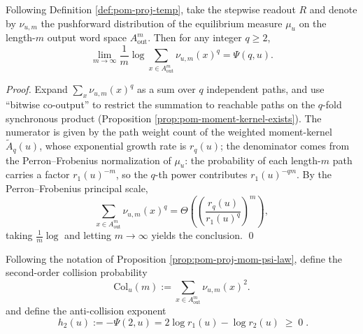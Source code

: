 \begin{proposition}\label{prop:pom-proj-mom-psi-law}
Following Definition \ref{def:pom-proj-temp}, take the stepwise readout \(R\) and denote by \(\nu_{u,m}\) the pushforward distribution of the equilibrium measure \(\mu_u\) on the length-\(m\) output word space \(A_{\mathrm{out}}^m\).
Then for any integer \(q\ge 2\),
\[
\lim_{m\to\infty}\frac{1}{m}\log\sum_{x\in A_{\mathrm{out}}^m}\nu_{u,m}(x)^q
=\Psi(q,u).
\]
\end{proposition}

\begin{proof}
Expand \(\sum_x\nu_{u,m}(x)^q\) as a sum over \(q\) independent paths, and use ``bitwise co-output'' to restrict the summation to reachable paths on the \(q\)-fold synchronous product (Proposition \ref{prop:pom-moment-kernel-exists}).
The numerator is given by the path weight count of the weighted moment-kernel \(\widetilde A_q(u)\), whose exponential growth rate is \(r_q(u)\); the denominator comes from the Perron--Frobenius normalization of \(\mu_u\): the probability of each length-\(m\) path carries a factor \(r_1(u)^{-m}\), so the \(q\)-th power contributes \(r_1(u)^{-qm}\).
By the Perron--Frobenius principal scale,
\[
\sum_{x\in A_{\mathrm{out}}^m}\nu_{u,m}(x)^q=\Theta\!\left(\left(\frac{r_q(u)}{r_1(u)^q}\right)^{\!m}\right),
\]
taking \(\frac1m\log\) and letting \(m\to\infty\) yields the conclusion. \qed
\end{proof}

\begin{definition}\label{def:pom-col-u-h2}
Following the notation of Proposition \ref{prop:pom-proj-mom-psi-law}, define the second-order collision probability
\[
\mathrm{Col}_u(m)
:=
\sum_{x\in A_{\mathrm{out}}^m}\nu_{u,m}(x)^2.
\]
and define the anti-collision exponent
\[
\boxed{\;
h_2(u):=-\Psi(2,u)=2\log r_1(u)-\log r_2(u)\;\ge\;0\; }.
\]
\end{definition}

